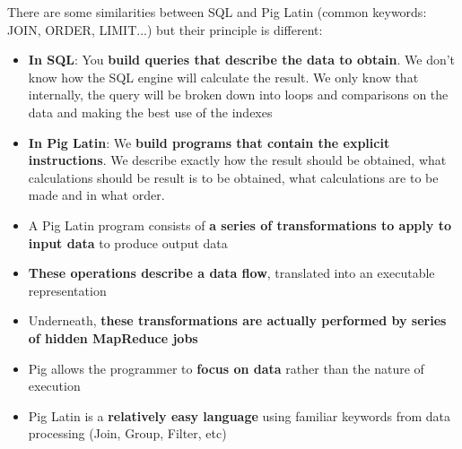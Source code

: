 \documentclass{beamer}[10pt, usepdftitle=false handout]
\begin{document}
\begin{frame}
There are some similarities between SQL and Pig Latin (common keywords: JOIN, ORDER, LIMIT...) but their principle is different:
\vspace*{0.6em}

\begin{itemize} 
\item{\textbf{In SQL}: You \textbf{build queries that describe the data to obtain}. We don't know how the SQL engine will calculate the result. We only know that internally, the query will be broken down into loops and comparisons on the data and making the best use of the indexes}
\item{\textbf{In Pig Latin}: We \textbf{build programs that contain the explicit instructions}. We describe exactly how the result should be obtained, what calculations should be result is to be obtained, what calculations are to be made and in what order.}
\end{itemize}

\end{frame}

\begin{frame}

\begin{itemize}
\item{A Pig Latin program consists of \textbf{a series of transformations to apply to input data} to produce output data}
\item{\textbf{These operations describe a data flow}, translated into an executable representation}
\item{Underneath, \textbf{these transformations are actually performed by series of hidden MapReduce jobs}}
\item{Pig allows the programmer to \textbf{focus on data} rather than the nature of execution}
\item{Pig Latin is a \textbf{relatively easy language} using familiar keywords from data processing (Join, Group, Filter, etc)}
\end{itemize}

\end{frame}
\end{document}
